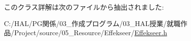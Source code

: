 このクラス詳解は次のファイルから抽出されました\+:\begin{DoxyCompactItemize}
\item 
C\+:/\+H\+A\+L/\+P\+G関係/03\+\_\+作成プログラム/03\+\_\+\+H\+A\+L授業/就職作品/\+Project/source/05\+\_\+\+Resource/\+Effekseer/\mbox{\hyperlink{_effekseer_8h}{Effekseer.\+h}}\end{DoxyCompactItemize}
